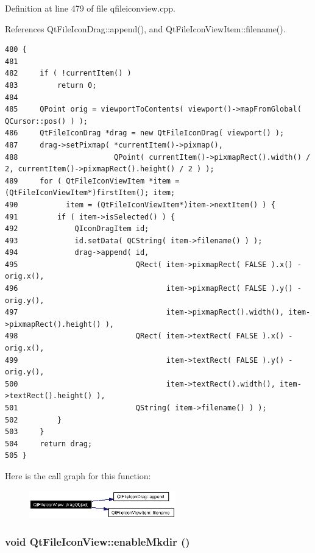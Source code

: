 Definition at line 479 of file qfileiconview.cpp.

References Qt\-File\-Icon\-Drag::append(), and Qt\-File\-Icon\-View\-Item::filename().



\footnotesize\begin{verbatim}480 {
481 
482     if ( !currentItem() )
483         return 0;
484 
485     QPoint orig = viewportToContents( viewport()->mapFromGlobal( QCursor::pos() ) );
486     QtFileIconDrag *drag = new QtFileIconDrag( viewport() );
487     drag->setPixmap( *currentItem()->pixmap(),
488                      QPoint( currentItem()->pixmapRect().width() / 2, currentItem()->pixmapRect().height() / 2 ) );
489     for ( QtFileIconViewItem *item = (QtFileIconViewItem*)firstItem(); item;
490           item = (QtFileIconViewItem*)item->nextItem() ) {
491         if ( item->isSelected() ) {
492             QIconDragItem id;
493             id.setData( QCString( item->filename() ) );
494             drag->append( id,
495                           QRect( item->pixmapRect( FALSE ).x() - orig.x(),
496                                  item->pixmapRect( FALSE ).y() - orig.y(),
497                                  item->pixmapRect().width(), item->pixmapRect().height() ),
498                           QRect( item->textRect( FALSE ).x() - orig.x(),
499                                  item->textRect( FALSE ).y() - orig.y(),
500                                  item->textRect().width(), item->textRect().height() ),
501                           QString( item->filename() ) );
502         }
503     }
504     return drag;
505 }
\end{verbatim}\normalsize 


Here is the call graph for this function:\begin{figure}[H]
\begin{center}
\leavevmode
\includegraphics[width=180pt]{classQtFileIconView_QtFileIconViewb1_cgraph}
\end{center}
\end{figure}
\subsubsection{\setlength{\rightskip}{0pt plus 5cm}void Qt\-File\-Icon\-View::enable\-Mkdir ()\hspace{0.3cm}{\tt  [signal]}}\label{classQtFileIconView_QtFileIconViewl6}




